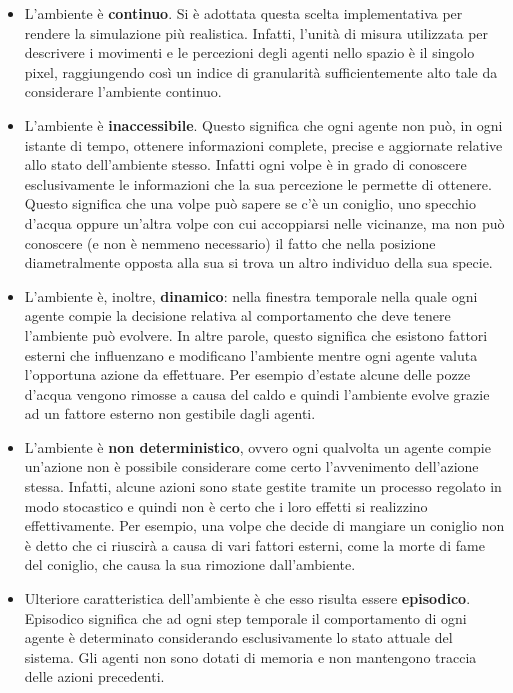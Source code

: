 \documentclass[11pt]{article}
\begin{document}
\begin{itemize}
    \item L'ambiente è \textbf{continuo}. Si è adottata questa scelta implementativa per rendere la simulazione più realistica. Infatti, l'unità di misura utilizzata per descrivere i movimenti e le percezioni degli agenti nello spazio è il singolo pixel, raggiungendo così un indice di granularità sufficientemente alto tale da considerare l'ambiente continuo.
    \item L'ambiente è \textbf{inaccessibile}. Questo significa che ogni agente non può, in ogni istante di tempo, ottenere informazioni complete, precise e aggiornate relative allo stato dell'ambiente stesso. Infatti ogni volpe è in grado di conoscere esclusivamente le informazioni che la sua percezione le permette di ottenere. Questo significa che una volpe può sapere se c'è un coniglio, uno specchio d'acqua oppure un'altra volpe con cui accoppiarsi nelle vicinanze, ma non può conoscere (e non è nemmeno necessario) il fatto che nella posizione diametralmente opposta alla sua si trova un altro individuo della sua specie.
    \item L'ambiente è, inoltre, \textbf{dinamico}: nella finestra temporale nella quale ogni agente compie la decisione relativa al comportamento che deve tenere l'ambiente può evolvere. In altre parole, questo significa che esistono fattori esterni che influenzano e modificano l'ambiente mentre ogni agente valuta l'opportuna azione da effettuare. Per esempio d'estate alcune delle pozze d'acqua vengono rimosse a causa del caldo e quindi l'ambiente evolve grazie ad un fattore esterno non gestibile dagli agenti.
    \item L'ambiente è \textbf{non deterministico}, ovvero ogni qualvolta un agente compie un'azione non è possibile considerare come certo l'avvenimento dell'azione stessa. Infatti, alcune azioni sono state gestite tramite un processo regolato in modo stocastico e quindi non è certo che i loro effetti si realizzino effettivamente. Per esempio, una volpe che decide di mangiare un coniglio non è detto che ci riuscirà a causa di vari fattori esterni, come la morte di fame del coniglio, che causa la sua rimozione dall'ambiente. 
    \item Ulteriore caratteristica dell'ambiente è che esso risulta essere \textbf{episodico}. Episodico significa che ad ogni step temporale il comportamento di ogni agente è determinato considerando esclusivamente lo stato attuale del sistema. Gli agenti non sono dotati di memoria e non  mantengono traccia delle azioni precedenti. 
\end{itemize}
\end{document}
